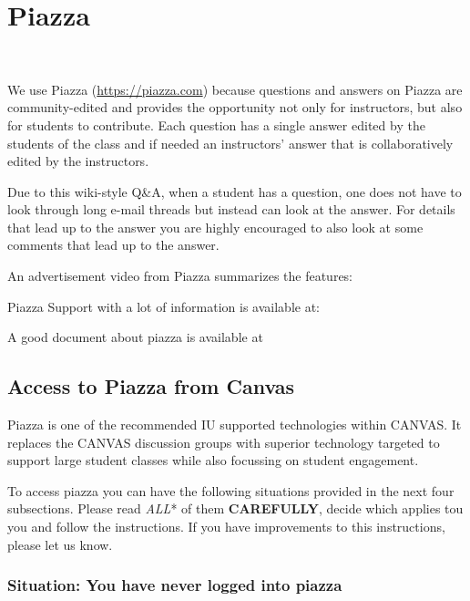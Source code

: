 
\chapter{Piazza}\label{C:piazza}

\FILENAME\

We use Piazza (\url{https://piazza.com}) because questions and answers
on Piazza are community-edited and provides the opportunity not only
for instructors, but also for students to contribute. Each question
has a single answer edited by the students of the class and if needed
an instructors' answer that is collaboratively edited by the
instructors.

Due to this wiki-style Q\&A, when a student has a question, one does not
have to look through long e-mail threads but instead can look at the
answer. For details that lead up to the answer you are highly encouraged
to also look at some comments that lead up to the answer.

An advertisement video from Piazza summarizes the features:


Piazza Support with a lot of information is available at:


A good document about piazza is available at


\section{Access to Piazza from Canvas}

Piazza is one of the recommended IU supported technologies within
CANVAS. It replaces the CANVAS discussion groups with superior
technology targeted to support large student classes while also
focussing on student engagement.

To access piazza you can have the following situations provided in the
next four subsections. Please read \emph{ALL}* of them
\textbf{CAREFULLY}, decide which applies tou you and follow the
instructions. If you have improvements to this instructions, please let
us know.

\subsection*{Situation: You have never logged into piazza}

